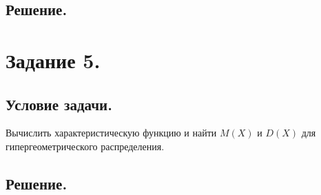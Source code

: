 \documentclass[a4paper, 12pt]{article}
\begin{document}
    \subsection{Решение.}



    \section{Задание 5.}
    \subsection{Условие задачи.}
    Вычислить характеристическую функцию и найти $M(X)$ и $D(X)$ для
    гипергеометрического распределения.


    \subsection{Решение.}
\end{document}
